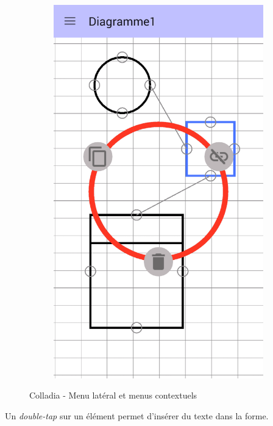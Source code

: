\begin{figure}[!h]
\begin{subfigure}[t]{.3\textwidth}
				\includegraphics[width=\textwidth]{img/screen/new/colladia_draw_view_menu_contextuel_select}
			\end{subfigure}
			\caption{Colladia - Menu latéral et menus contextuels}
		\end{figure}
		\vspace*{\fill}

Un \textit{double-tap} sur un élément permet d'insérer du texte dans la forme.

